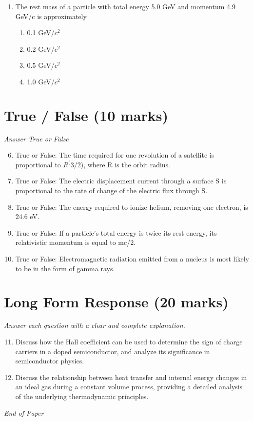 \documentclass[12pt]{article}
\begin{document}
\begin{enumerate}[label=\arabic*.]
\begin{enumerate}[label=(\alph*)]
    \item decreased by a factor of 49
    \item decreased by a factor of 81
    \item increased by a factor of 9
\end{enumerate}
\item The rest mass of a particle with total energy 5.0 GeV and momentum 4.9 GeV/c is approximately
\begin{enumerate}[label=(\alph*)]
    \item 0.1 GeV/$c^2$
    \item 0.2 GeV/$c^2$
    \item 0.5 GeV/$c^2$
    \item 1.0 GeV/$c^2$
\end{enumerate}
\end{enumerate}

\section*{True / False (10 marks)}
\textit{Answer True or False}
\begin{enumerate}[label=\arabic*.]
\setcounter{enumi}{5}
\item True or False: The time required for one revolution of a satellite is proportional to $R^(3$/2), where R is the orbit radius.
\item True or False: The electric displacement current through a surface S is proportional to the rate of change of the electric flux through S.
\item True or False: The energy required to ionize helium, removing one electron, is 24.6 eV.
\item True or False: If a particle's total energy is twice its rest energy, its relativistic momentum is equal to mc/2.
\item True or False: Electromagnetic radiation emitted from a nucleus is most likely to be in the form of gamma rays.
\end{enumerate}

\section*{Long Form Response (20 marks)}
\textit{Answer each question with a clear and complete explanation.}
\begin{enumerate}[label=\arabic*.]
\setcounter{enumi}{10}
\item Discuss how the Hall coefficient can be used to determine the sign of charge carriers in a doped semiconductor, and analyze its significance in semiconductor physics.
\item Discuss the relationship between heat transfer and internal energy changes in an ideal gas during a constant volume process, providing a detailed analysis of the underlying thermodynamic principles.
\end{enumerate}

\vfill
\noindent\textit{End of Paper}
\end{document}
